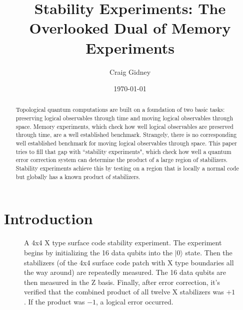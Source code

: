 \documentclass[onecolumn,unpublished,a4paper]{quantumarticle}
\theoremstyle{definition}
\theoremstyle{definition}
\theoremstyle{definition}
\begin{document}
\title{Stability Experiments: The Overlooked Dual of Memory Experiments}

\date{\today}
\author{Craig Gidney}

\begin{abstract}
Topological quantum computations are built on a foundation of two basic tasks:
preserving logical observables through time
and moving logical observables through space.
Memory experiments, which check how well logical observables are preserved through time, are a well established benchmark.
Strangely, there is no corresponding well established benchmark for moving logical observables through space.
This paper tries to fill that gap with ``stability experiments", which check how well a quantum error correction system can determine the product of a large region of stabilizers.
Stability experiments achieve this by testing on a region that is locally a normal code but globally has a known product of stabilizers.
\end{abstract}

\maketitle

\section{Introduction}
\label{sec:introduction}

\begin{figure}[b!]
    \centering
    \caption{
        A 4x4 X type surface code stability experiment.
        The experiment begins by initializing the 16 data qubits into the $|0\rangle$ state.
        Then the stabilizers (of the 4x4 surface code patch with X type boundaries all the way around) are repeatedly measured.
        The 16 data qubits are then measured in the Z basis.
        Finally, after error correction, it's verified that the combined product of all twelve X stabilizers was $+1$.
        If the product was $-1$, a logical error occurred.
    }
    \label{fig:4x4_X}
\end{figure}
\end{document}
